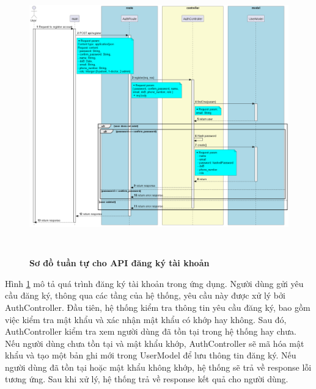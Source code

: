 \begin{figure}[H]
  \centering
  \includegraphics[width=16cm,height=12cm]{Images/server/sequence/server/register.png}
  \caption[Sơ đồ tuần tự cho API đăng ký tài khoản]{\bfseries \fontsize{12pt}{0pt}
  \selectfont Sơ đồ tuần tự cho API đăng ký tài khoản }
  \label{backend_register} %
\end{figure}
Hình \ref{backend_register} mô tả quá trình đăng ký tài khoản trong ứng dụng. Người dùng gửi yêu cầu đăng ký, thông qua các tầng của hệ thống, yêu cầu này được xử lý bởi AuthController. Đầu tiên, hệ thống kiểm tra thông tin yêu cầu đăng ký, bao gồm việc kiểm tra mật khẩu và xác nhận mật khẩu có khớp hay không. Sau đó, AuthController kiểm tra xem người dùng đã tồn tại trong hệ thống hay chưa. Nếu người dùng chưa tồn tại và mật khẩu khớp, AuthController sẽ mã hóa mật khẩu và tạo một bản ghi mới trong UserModel để lưu thông tin đăng ký. Nếu người dùng đã tồn tại hoặc mật khẩu không khớp, hệ thống sẽ trả về response lỗi tương ứng. Sau khi xử lý, hệ thống trả về response kết quả cho người dùng.


